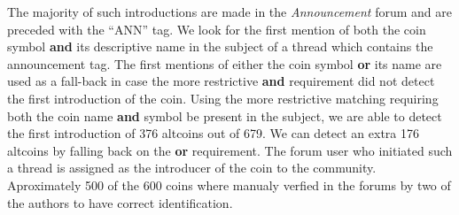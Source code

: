 The  majority of such introductions are made in the \textit{Announcement} forum and are preceded with the ``ANN'' tag. We look for the first mention of both the coin symbol \textbf{and} its descriptive name in the subject of a thread which contains the announcement tag. The first mentions of either the coin symbol \textbf{or} its name are used as a fall-back in case the more restrictive \textbf{and} requirement did not detect the first introduction of the coin.
Using the more restrictive matching requiring both the coin name \textbf{and} symbol be present in the subject, we are able to detect the first introduction of 376 altcoins out of 679. 
We can detect an extra 176 altcoins by falling back on the \textbf{or} requirement.
The forum user who initiated such a thread is assigned as the introducer of the coin to the community.
Aproximately 500 of the 600 coins where manualy verfied in the forums by two of the authors to have correct identification.
